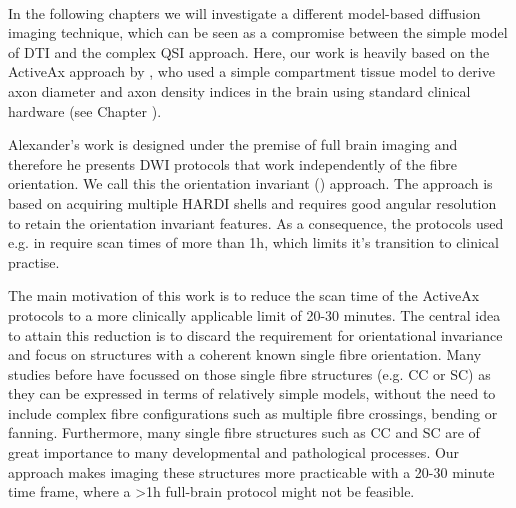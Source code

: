 \paragraph{}
In the following chapters we will investigate a different model-based diffusion imaging technique, which can be seen as a compromise between the simple model of DTI and the complex QSI approach. Here, our work is heavily based on the ActiveAx approach by \citet{Alexander:2008}, who used a simple compartment tissue model to derive axon diameter and axon density indices in the brain using standard clinical hardware (see Chapter ).


Alexander's work is designed under the premise of full brain imaging and therefore he presents DWI protocols that work independently of the fibre orientation. We call this the orientation invariant ({\OI}) approach. The {\OI} approach is based on acquiring multiple HARDI shells and requires good angular resolution to retain the orientation invariant features. As a consequence, the {\OI} protocols used e.g. in \citep{Alexander:2010} require scan times of more than 1h, which limits it's transition to clinical practise.


The main motivation of this work is to reduce the scan time of the ActiveAx protocols to a more clinically applicable limit of 20-30 minutes. The central idea to attain this reduction is to discard the requirement for orientational invariance and focus on structures with a coherent known single fibre orientation. Many studies before have focussed on those single fibre structures (e.g. \gls{CC} or \gls{SC}) as they can be expressed in terms of relatively simple models, without the need to include complex fibre configurations such as multiple fibre crossings, bending or fanning. Furthermore, many single fibre structures such as \gls{CC} and \gls{SC} are of great importance to many developmental and pathological processes. Our approach makes imaging these structures more practicable with a 20-30 minute time frame, where a >1h full-brain protocol might not be feasible.
